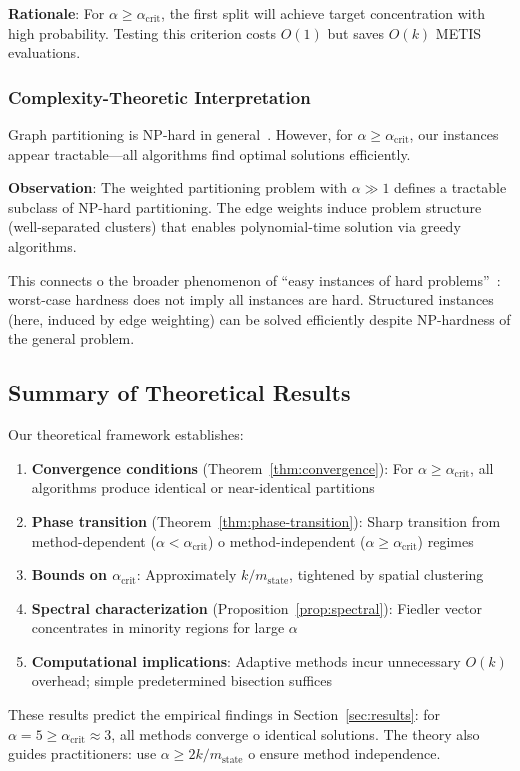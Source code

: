 \textbf{Rationale}: For $\alpha \geq \alpha_{\text{crit}}$, the first split will achieve target concentration with high probability. Testing this criterion costs $O(1)$ but saves $O(k)$ METIS evaluations.

\subsubsection{Complexity-Theoretic Interpretation}

Graph partitioning is NP-hard in general~\cite{garey1979}. However, for $\alpha \geq \alpha_{\text{crit}}$, our instances appear tractable---all algorithms find optimal solutions efficiently.

\textbf{Observation}: The weighted partitioning problem with $\alpha \gg 1$ defines a tractable subclass of NP-hard partitioning. The edge weights induce problem structure (well-separated clusters) that enables polynomial-time solution via greedy algorithms.

This connects 	o the broader phenomenon of ``easy instances of hard problems''~\cite{spielman2004}: worst-case hardness does not imply all instances are hard. Structured instances (here, induced by edge weighting) can be solved efficiently despite NP-hardness of the general problem.

\subsection{Summary of Theoretical Results}

Our theoretical framework establishes:

\begin{enumerate}
    \item \textbf{Convergence conditions} (Theorem~\ref{thm:convergence}): For $\alpha \geq \alpha_{\text{crit}}$, all algorithms produce identical or near-identical partitions
    \item \textbf{Phase transition} (Theorem~\ref{thm:phase-transition}): Sharp transition from method-dependent ($\alpha < \alpha_{\text{crit}}$) 	o method-independent ($\alpha \geq \alpha_{\text{crit}}$) regimes
    \item \textbf{Bounds on $\alpha_{\text{crit}}$}: Approximately $k / m_{\text{state}}$, tightened by spatial clustering
    \item \textbf{Spectral characterization} (Proposition~\ref{prop:spectral}): Fiedler vector concentrates in minority regions for large $\alpha$
    \item \textbf{Computational implications}: Adaptive methods incur unnecessary $O(k)$ overhead; simple predetermined bisection suffices
\end{enumerate}

These results predict the empirical findings in Section~\ref{sec:results}: for $\alpha = 5 \geq \alpha_{\text{crit}} \approx 3$, all methods converge 	o identical solutions. The theory also guides practitioners: use $\alpha \geq 2k / m_{\text{state}}$ 	o ensure method independence.
